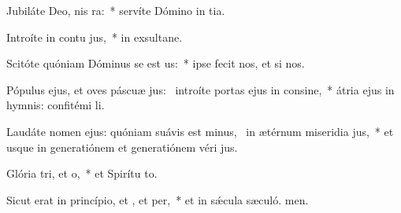 \item Jubiláte Deo, nis ra:~* servíte Dómino in tia.
\item Introíte in contu jus,~* in exsultane.
\item Scitóte quóniam Dóminus se est us:~* ipse fecit nos, et  si nos.
\item Pópulus ejus, et oves páscuæ jus:~\pscross{} introíte portas ejus in consine,~* átria ejus in hymnis: confitémi li.
\item Laudáte nomen ejus: quóniam suávis est minus,~\pscross{} in ætérnum miseridia jus,~* et usque in generatiónem et generatiónem véri jus.
\item Glória tri, et o,~* et Spirítu to.
\item Sicut erat in princípio, et , et per,~* et in sǽcula sæculó. men.
